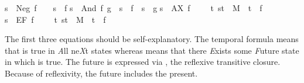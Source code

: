 \begin{isabellebody}
{\isachardoublequoteopen}s\ {\isasymTurnstile}\ Neg\ f\ \ \ {\isacharequal}\ {\isacharparenleft}{\isasymnot}{\isacharparenleft}s\ {\isasymTurnstile}\ f{\isacharparenright}{\isacharparenright}{\isachardoublequoteclose}\isanewline
{\isachardoublequoteopen}s\ {\isasymTurnstile}\ And\ f\ g\ {\isacharequal}\ {\isacharparenleft}s\ {\isasymTurnstile}\ f\ {\isasymand}\ s\ {\isasymTurnstile}\ g{\isacharparenright}{\isachardoublequoteclose}\isanewline
{\isachardoublequoteopen}s\ {\isasymTurnstile}\ AX\ f\ \ \ \ {\isacharequal}\ {\isacharparenleft}{\isasymforall}t{\isachardot}\ {\isacharparenleft}s{\isacharcomma}t{\isacharparenright}\ {\isasymin}\ M\ {\isasymlongrightarrow}\ t\ {\isasymTurnstile}\ f{\isacharparenright}{\isachardoublequoteclose}\isanewline
{\isachardoublequoteopen}s\ {\isasymTurnstile}\ EF\ f\ \ \ \ {\isacharequal}\ {\isacharparenleft}{\isasymexists}t{\isachardot}\ {\isacharparenleft}s{\isacharcomma}t{\isacharparenright}\ {\isasymin}\ M\isactrlsup {\isacharasterisk}\ {\isasymand}\ t\ {\isasymTurnstile}\ f{\isacharparenright}{\isachardoublequoteclose}%
\begin{isamarkuptext}%
\noindent
The first three equations should be self-explanatory. The temporal formula
 means that  is true in \emph{A}ll ne\emph{X}t states whereas
 means that there \emph{E}xists some \emph{F}uture state in which  is
true. The future is expressed via \isa{\isactrlsup {\isacharasterisk}}, the reflexive transitive
closure. Because of reflexivity, the future includes the present.


\end{isamarkuptext}
\end{isabellebody}
